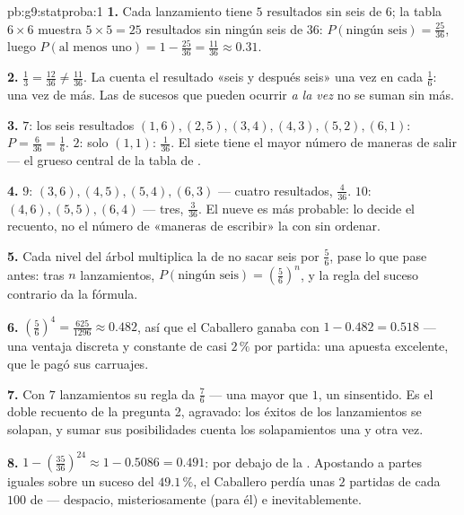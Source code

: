 \begin{solution}{pb:g9:statproba:1}
\textbf{1.} Cada lanzamiento tiene $5$ resultados sin seis de $6$; la
tabla $6 \times 6$ muestra $5 \times 5 = 25$ resultados sin ningún seis de
$36$: $P(\text{ningún seis}) = \frac{25}{36}$, luego
$P(\text{al menos uno}) = 1 - \frac{25}{36} = \frac{11}{36}
\approx 0.31$.

\textbf{2.} $\frac13 = \frac{12}{36} \neq \frac{11}{36}$. La
 cuenta el resultado «seis y después seis» una vez en cada
$\frac16$: una vez de más. Las  de sucesos que pueden
ocurrir \emph{a la vez} no se suman sin más.

\textbf{3.}  $7$: los seis resultados $(1,6), (2,5), (3,4),
(4,3), (5,2), (6,1)$: $P = \frac{6}{36} = \frac16$.  $2$:
solo $(1,1)$: $\frac{1}{36}$. El siete tiene el mayor número de maneras de
salir --- el grueso central de la tabla de .

\textbf{4.}  $9$: $(3,6), (4,5), (5,4), (6,3)$ --- cuatro
resultados, $\frac{4}{36}$.  $10$: $(4,6), (5,5), (6,4)$ ---
tres, $\frac{3}{36}$. El nueve es más probable: lo decide el recuento,
no el número de «maneras de escribir» la  con 
sin ordenar.

\textbf{5.} Cada nivel del árbol multiplica la 
de no sacar seis por $\frac56$, pase lo que pase antes: tras $n$
lanzamientos, $P(\text{ningún seis}) = \left(\frac56\right)^n$, y
la regla del suceso contrario da la fórmula.

\textbf{6.} $\left(\frac56\right)^4 = \frac{625}{1296} \approx
0.482$, así que el Caballero ganaba con 
$1 - 0.482 = 0.518$ --- una ventaja discreta y constante de casi
$2\,\%$ por partida: una apuesta excelente, que le pagó sus
carruajes.

\textbf{7.} Con $7$ lanzamientos su regla da $\frac76$ --- una
 mayor que $1$, un sinsentido. Es el doble recuento
de la pregunta 2, agravado: los éxitos de los lanzamientos se solapan, y
sumar sus posibilidades cuenta los solapamientos una y otra vez.

\textbf{8.} $1 - \left(\frac{35}{36}\right)^{24} \approx
1 - 0.5086 = 0.491$: por debajo de la . Apostando a partes iguales sobre un
suceso del $49.1\,\%$, el Caballero perdía unas $2$ partidas de cada
$100$ de  --- despacio, misteriosamente (para él) e
inevitablemente.


\end{solution}
